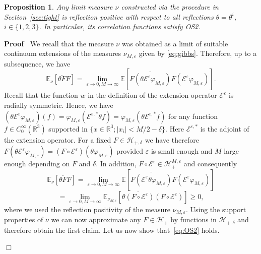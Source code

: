 \documentclass[a4paper,11pt]{article}
\newenvironment{proof}{\noindent\textbf{Proof\ }}{\hspace*{\fill}$\Box$\medskip}
\newtheorem{proposition}[theorem]{Proposition}
\numberwithin{equation}{section}
\begin{document}
\begin{proposition}\label{prop:RP}
  Any limit measure $\nu$ constructed via the procedure in
  Section~\ref{sec:tight} is reflection positive with respect to all
  reflections $\theta = \theta^i$, $i \in \{1, 2,3\}$. In particular, its correlation functions
  satisfy {\em OS2}.
\end{proposition}


\begin{proof}
  We recall that the measure $\nu$ was obtained as a
  limit of suitable continuum extensions of the measures $\nu_{M,
  \varepsilon}$ given by {\eqref{eq:gibbs}}. 
 Therefore, up to a subsequence, we have
  \[ \mathbb{E}_{\nu}  [\overline{\theta F} F]  = \lim_{\varepsilon
     \rightarrow 0, M \rightarrow \infty} \mathbb{E} [\overline{F (\theta
     \mathcal{E}^{\varepsilon} \varphi_{M, \varepsilon})} F
     (\mathcal{E}^{\varepsilon} \varphi_{M, \varepsilon})] . \]
 Recall  that the function $w$ in the definition of the
  extension operator $\mathcal{E}^{\varepsilon}$ is radially
  symmetric. Hence, we have
$
(\theta
     \mathcal{E}^{\varepsilon} \varphi_{M, \varepsilon})(f)= 
     \varphi_{M, \varepsilon}(\mathcal{E}^{\varepsilon,*} \theta f) =\varphi_{M, \varepsilon}(\theta \mathcal{E}^{\varepsilon,*}  f)
$  
for any function $f\in C^\infty_0(\mathbb{R}^3)$  supported in $\{x\in\mathbb{R}^{3};|x_i| <  M/2 -\delta\}$. Here $\mathcal{E}^{\varepsilon,*}$ is the adjoint of the extension operator. For a fixed $F  \in \mathcal{H}_{+, \delta}$ we have therefore $F (\theta
     \mathcal{E}^{\varepsilon} \varphi_{M, \varepsilon})=(F \circ \mathcal{E}^{\varepsilon})(
      \theta\varphi_{M, \varepsilon})$  provided $\varepsilon$ is small enough and $M$ large enough depending  on $F$ and
  $\delta$. In addition,   $F \circ \mathcal{E}^{\varepsilon}
  \in \mathcal{H}_{+}^{M, \varepsilon}$  and consequently
  \[ \mathbb{E}_{\nu}  [\overline{\theta F} F] = \lim_{\varepsilon \rightarrow
     0, M \rightarrow \infty} \mathbb{E} [\overline{F
     (\mathcal{E}^{\varepsilon} \theta \varphi_{M, \varepsilon})} F
     (\mathcal{E}^{\varepsilon} \varphi_{M, \varepsilon})] \]
  \[ = \lim_{\varepsilon \rightarrow 0, M \rightarrow \infty} \mathbb{E}_{\nu_{M, \varepsilon}}
     [\overline{\theta (F \circ \mathcal{E}^{\varepsilon})} (F \circ \mathcal{E}^{\varepsilon})] \geqslant 0, \]
  where we used the reflection positivity  of the  measure $\nu_{M, \varepsilon}$.
  Using the support properties of $\nu$ we can now approximate any $F \in
  \mathcal{H}_+$ by functions in $\mathcal{H}_{+, \delta}$ and therefore
  obtain the first claim. Let us now show that~{\eqref{eq:OS2}} holds.

\end{proof}
\end{document}
